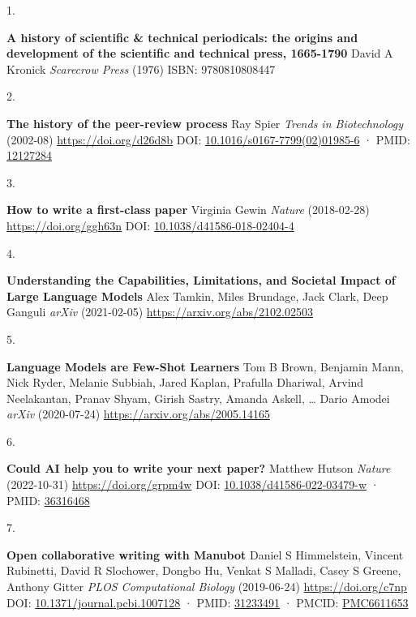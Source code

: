 \documentclass[
]{article}
\newlength{\cslhangindent}
\newlength{\csllabelwidth}
\newlength{\cslentryspacingunit} %
\newenvironment{CSLReferences}[2] %
 {%
  \setlength{\parindent}{0pt}
  \ifodd #1
  \let\oldpar\par
  \def\par{\hangindent=\cslhangindent\oldpar}
  \fi
  \setlength{\parskip}{#2\cslentryspacingunit}
 }%
 {}
\newcommand{\CSLBlock}[1]{#1\hfill\break}
\newcommand{\CSLLeftMargin}[1]{\parbox[t]{\csllabelwidth}{#1}}
\newcommand{\CSLRightInline}[1]{\parbox[t]{\linewidth - \csllabelwidth}{#1}\break}
\begin{document}
\hypertarget{refs}{}
\begin{CSLReferences}{0}{0}
\leavevmode{}%
\CSLLeftMargin{1. }%
\CSLRightInline{\textbf{A history of scientific \& technical periodicals: the origins and development of the scientific and technical press, 1665-1790}
\CSLBlock{David A Kronick} \emph{Scarecrow Press} (1976)
\CSLBlock{ISBN: 9780810808447}}

\leavevmode{}%
\CSLLeftMargin{2. }%
\CSLRightInline{\textbf{The history of the peer-review process}
\CSLBlock{Ray Spier} \emph{Trends in Biotechnology} (2002-08) \url{https://doi.org/d26d8b}
\CSLBlock{DOI: \href{https://doi.org/10.1016/s0167-7799(02)01985-6}{10.1016/s0167-7799(02)01985-6} · PMID: \href{https://www.ncbi.nlm.nih.gov/pubmed/12127284}{12127284}}}

\leavevmode{}%
\CSLLeftMargin{3. }%
\CSLRightInline{\textbf{How to write a first-class paper}
\CSLBlock{Virginia Gewin} \emph{Nature} (2018-02-28) \url{https://doi.org/ggh63n}
\CSLBlock{DOI: \href{https://doi.org/10.1038/d41586-018-02404-4}{10.1038/d41586-018-02404-4}}}

\leavevmode{}%
\CSLLeftMargin{4. }%
\CSLRightInline{\textbf{Understanding the Capabilities, Limitations, and Societal Impact of Large Language Models}
\CSLBlock{Alex Tamkin, Miles Brundage, Jack Clark, Deep Ganguli} \emph{arXiv} (2021-02-05) \url{https://arxiv.org/abs/2102.02503}}

\leavevmode{}%
\CSLLeftMargin{5. }%
\CSLRightInline{\textbf{Language Models are Few-Shot Learners}
\CSLBlock{Tom B Brown, Benjamin Mann, Nick Ryder, Melanie Subbiah, Jared Kaplan, Prafulla Dhariwal, Arvind Neelakantan, Pranav Shyam, Girish Sastry, Amanda Askell, \ldots{} Dario Amodei} \emph{arXiv} (2020-07-24) \url{https://arxiv.org/abs/2005.14165}}

\leavevmode{}%
\CSLLeftMargin{6. }%
\CSLRightInline{\textbf{Could AI help you to write your next paper?}
\CSLBlock{Matthew Hutson} \emph{Nature} (2022-10-31) \url{https://doi.org/grpm4w}
\CSLBlock{DOI: \href{https://doi.org/10.1038/d41586-022-03479-w}{10.1038/d41586-022-03479-w} · PMID: \href{https://www.ncbi.nlm.nih.gov/pubmed/36316468}{36316468}}}

\leavevmode{}%
\CSLLeftMargin{7. }%
\CSLRightInline{\textbf{Open collaborative writing with Manubot}
\CSLBlock{Daniel S Himmelstein, Vincent Rubinetti, David R Slochower, Dongbo Hu, Venkat S Malladi, Casey S Greene, Anthony Gitter} \emph{PLOS Computational Biology} (2019-06-24) \url{https://doi.org/c7np}
\CSLBlock{DOI: \href{https://doi.org/10.1371/journal.pcbi.1007128}{10.1371/journal.pcbi.1007128} · PMID: \href{https://www.ncbi.nlm.nih.gov/pubmed/31233491}{31233491} · PMCID: \href{https://www.ncbi.nlm.nih.gov/pmc/articles/PMC6611653}{PMC6611653}}}


\end{CSLReferences}
\end{document}
